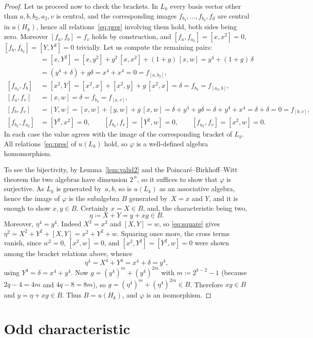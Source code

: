 \documentclass[11pt,reqno]{amsart}
\theoremstyle{plain}
\theoremstyle{remark}
\begin{document}
\begin{proof}
Let us proceed now to check the brackets. In $L_k$ every basis vector other than
$a,b,b_2,a_2,v$ is central, and the corresponding images
$f_{b_4},\dots,f_{b_q},f_d$ are central in $u(H_k)$, hence all relations~\eqref{eq:pres} involving them hold, both sides being zero. Moreover
$[f_a,f_b]=f_v$ holds by construction, and
$[f_a,f_{a_2}]=[x,x^2]=0$, $[f_b,f_{b_2}]=[Y,Y^2]=0$ trivially. Let us compute the remaining pairs:
\begin{align*}
[f_a,f_{b_2}]&=[x,Y^2]=[x,y^2]+g^2\,[x,x^2]+(1+g)\,[x,w]
=y^4+(1+g)\,\delta\\
&=(y^4+\delta)+g\delta=x^4+x^4=0=f_{[a,b_2]},\\[2pt]
[f_{a_2},f_b]&=[x^2,Y]=[x^2,x]+[x^2,y]+g\,[x^2,x]=\delta
=f_{b_4}=f_{[a_2,b]},\\[2pt]
[f_a,f_v]&=[x,w]=\delta=f_{b_4}=f_{[a,v]},\\[2pt]
[f_b,f_v]&=[Y,w]=[x,w]+[y,w]+g\,[x,w]=\delta+y^4+g\delta
=\delta+y^4+x^4=\delta+\delta=0=f_{[b,v]},\\[2pt]
[f_{b_2},f_{a_2}]&=[Y^2,x^2]=0,\qquad
[f_{b_2},f_v]=[Y^2,w]=0,\qquad
[f_{a_2},f_v]=[x^2,w]=0.
\end{align*} 
In each case the value agrees with
the image of the corresponding bracket of $L_k$. All relations~\eqref{eq:pres} of $u(L_k)$
hold, so $\varphi$ is a well-defined algebra homomorphism.

To see the bijectivity, by Lemma~\ref{lem:valid2} and the
Poincar\'e--Birkhoff--Witt theorem the two algebras have dimension $2^{\,n}$,
so it suffices to show that $\varphi$ is surjective. As $L_k$ is generated by~$a,b$, 
so is $u(L_k)$ as an associative algebra, hence the image of $\varphi$
is the subalgebra $B$ generated by~$X=x$ and $Y$, and it is enough to show
$x,y\in B$. Certainly $x=X\in B$, and, the characteristic being two,
\[
\eta\coloneqq X+Y=y+xg\in B .
\]
Moreover, $\eta^4=y^4$. Indeed $X^2=x^2$ and $[X,Y]=w$, so \eqref{eq:square} gives $\eta^2=X^2+Y^2+[X,Y]=x^2+Y^2+w$. Squaring
once more, the cross terms vanish, since $w^2=0$,
$[x^2,w]=0$, and $[x^2,Y^2]=[Y^2,w]=0$ were shown
among the bracket relations above, whence
\[
\eta^4=X^4+Y^4=x^4+\delta=y^4 ,
\]
using $Y^4=\delta=x^4+y^4$. Now $g=(y^4)^{m}+(y^4)^{2m}$ with
$m\coloneqq 2^{k-2}-1$ (because $2q-4=4m$ and $4q-8=8m$), so
$g=(\eta^4)^{m}+(\eta^4)^{2m}\in B$. Therefore $xg\in B$ and
$y=\eta+xg\in B$. Thus $B=u(H_k)$, and $\varphi$ is an isomorphism.
\end{proof}

\section{Odd characteristic}\label{sec:oddp}
\end{document}
